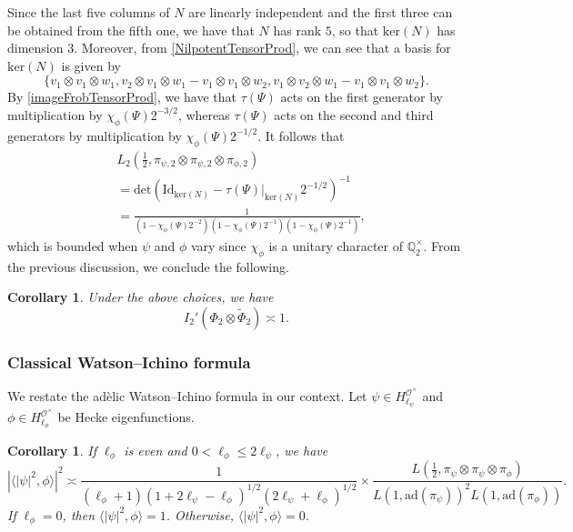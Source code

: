 \documentclass[11pt]{amsart}
\newtheorem{corollary}[theorem]{Corollary}
\theoremstyle{definition}
\begin{document}
Since the last five columns of $N$ are linearly independent and the first three can be obtained from the fifth one, we have that $N$ has rank $5$, so that $\mathrm{ker}(N)$ has dimension $3$. Moreover, from \eqref{NilpotentTensorProd}, we can see that a basis for $\mathrm{ker}(N)$ is given by $$\{v_1\otimes v_1\otimes w_1, v_2 \otimes v_1 \otimes w_1 - v_1\otimes v_1\otimes w_2, v_1 \otimes v_2 \otimes w_1 - v_1\otimes v_1 \otimes w_2\}.$$ By \eqref{imageFrobTensorProd}, we have that $\tau(\Psi)$ acts on the first generator by multiplication by $\chi_{\phi}(\Psi) 2^{-3/2}$, whereas $\tau(\Psi)$ acts on the second and third generators by multiplication by $\chi_{\phi}(\Psi) 2^{-1/2}$. It follows that 
\begin{align*}
    &L_2\left(\frac{1}{2}, \pi_{\psi,2} \otimes \pi_{\psi,2} \otimes \pi_{\phi,2} \right) \\
    &= \mathrm{det}\left( \mathrm{Id}_{\mathrm{ker}(N)} - \tau(\Psi)|_{\mathrm{ker}(N)} 2^{-1/2} \right)^{-1} \\
    &= \frac{1}{\left(1 - \chi_{\phi}(\Psi) 2^{-2} \right) \left(1 - \chi_{\phi}(\Psi) 2^{-1} \right) \left(1 - \chi_{\phi}(\Psi) 2^{-1} \right)},
\end{align*}
which is bounded when $\psi$ and $\phi$ vary since $\chi_{\phi}$ is a unitary character of $\mathbb{Q}_{2}^{\times}$. From the previous discussion, we conclude the following.

\begin{corollary}\label{LocalConst2Estimate}
Under the above choices, we have $$ I_{2}'(\Phi_2 \otimes \widetilde{\Phi}_2) \asymp 1.$$
\end{corollary}




\subsubsection{Classical Watson--Ichino formula}

We restate the adèlic Watson--Ichino formula in our context. Let $\psi\in H_{\ell_{\psi}}^{\mathcal{O}^{\times}}$ and $\phi \in H_{\ell_{\phi}}^{\mathcal{O}^{\times}}$ be Hecke eigenfunctions.

\begin{corollary}\label{WatsonIchinoClassical}
If $\ell_{\phi}$ is even and $0<\ell_{\phi} \leq 2\ell_{\psi}$, we have $$\left| \langle |\psi|^2, \phi \rangle \right|^2 \asymp \frac{1}{(\ell_{\phi}+1) (1+2\ell_{\psi} - \ell_{\phi})^{1/2}(2\ell_{\psi} + \ell_{\phi})^{1/2}} \times \frac{L(\frac{1}{2}, \pi_{\psi} \otimes \pi_{\psi} \otimes \pi_{\phi})}{L(1, \mathrm{ad}(\pi_{\psi}))^2 L(1, \mathrm{ad}(\pi_{\phi}))}.$$ If $\ell_{\phi}=0$, then $\langle |\psi|^2, \phi \rangle = 1$. Otherwise, $\langle |\psi|^2, \phi\rangle = 0$.
\end{corollary}
\end{document}
